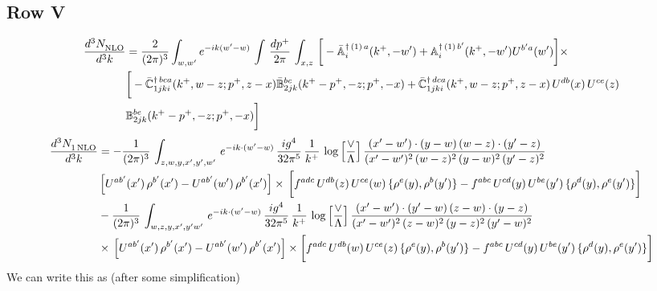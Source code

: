 \documentclass[9pt]{article}
\def\mf#1{\mathbb{#1}}
\numberwithin{equation}{section}
\begin{document}
\subsection{Row V}
\begin{align}
    \frac{d^{3}N_{\rm NLO}^{\rm}}{d^{3}k}  & = \frac{2}{(2\pi)^{3}}  \int_{w, w^\prime} e^{-ik(w^\prime-w)}\, \int\, \frac{dp^{+}}{2\pi}\,\int_{x,z}\, \bigg[-\bar{\mf{A}}^{\dagger\,(1)\,a}_{i}(k^{+},-w^{\prime})+\mf{A}^{\dagger\, (1)\, b^{\prime}}_{i}(k^{+},-w^{\prime})U^{b^{\prime}a}(w^{\prime})\bigg]\times\notag \\ & \bigg[-\Bar{\mf{C}}^{\dagger\, bca}_{1jki}(k^{+},w-z;p^{+},z-x)\Bar{\mf{B}}^{bc}_{2jk}(k^{+}-p^{+},- z;p^{+},-x)+\bar{\mf{C}}^{\dagger\, dca}_{1jki}(k^+,w-z; p^+, z-x)\,U^{db}(x)\,U^{ce}(z) \notag \\ & {\mf{B}}^{be}_{2jk} (k^{+}-p^+, -z; p^+, -x) \bigg]\nonumber
\end{align}
\begin{align}
     \frac{d^{3}N_{1\,\rm NLO}^{\rm}}{d^{3}k}  & =  -\frac{1}{(2\pi)^{3}}\, \int_{z,w,y,x',y',w'}\,e^{-ik\cdot (w^\prime-w)}\,\frac{ig^{4}}{32\pi^{5}}\, \frac{1}{k^{+}}\,\log{\left[\frac{\vee}{\Lambda}\right]}\,\frac{(x'-w')\cdot (y-w)\,(w-z)\cdot (y'-z)}{(x'-w')^{2}\,(w-z)^{2}\,(y-w)^{2}\,(y'-z)^{2}}\,\notag \\ & \left[U^{ab'}(x')\,\rho^{b'}(x')-U^{ab'}(w')\,\rho^{b'}(x')\right]\times\, \bigg[f^{adc}\,U^{db}(z)\,U^{ce}(w)\, \{\rho^{e}(y),\rho^{b}(y')\}-f^{abc}\,U^{cd}(y)\,U^{be}(y')\, \{\rho^{d}(y),\rho^{e}(y')\}\bigg]\notag \\ &  -\frac{1}{(2\pi)^{3}}\, \int_{w,z,y,x',y'w'}\,e^{-ik\cdot (w^\prime-w)}\,\frac{ig^{4}}{32\pi^{5}}\, \frac{1}{k^{+}}\,\log{\left[\frac{\vee}{\Lambda}\right]} \,\frac{(x'-w')\cdot (y'-w)\,(z-w)\cdot (y-z)}{(x'-w')^{2}\,(z-w)^{2}\,(y-z)^{2}\,(y'-w)^{2}}\notag \\ & \times\, \left[U^{ab'}(x')\,\rho^{b'}(x')-U^{ab'}(w')\,\rho^{b'}(x')\right]\times \bigg[f^{adc}\,U^{db}(w)\,U^{ce}(z)\, \{\rho^{e}(y),\rho^{b}(y')\}-f^{abc}\,U^{cd}(y)\,U^{be}(y')\, \{\rho^{d}(y),\rho^{e}(y')\}\bigg]
\end{align}
We can write this as (after some simplification)
\end{document}
